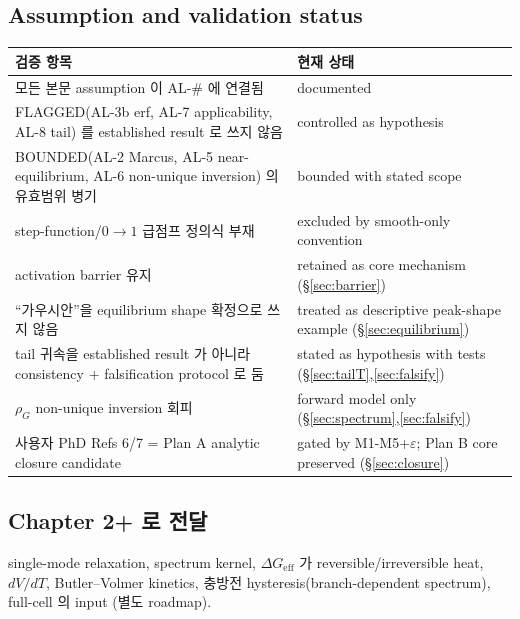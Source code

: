 \documentclass[11pt,a4paper]{article}
\newcommand{\eff}{\mathrm{eff}}
\begin{document}
\subsection{Assumption and validation status}
\begin{longtable}{p{} p{}}
\toprule 검증 항목 & 현재 상태 \\ \midrule \endhead
모든 본문 assumption 이 AL-\# 에 연결됨 & documented \\
FLAGGED(AL-3b erf, AL-7 applicability, AL-8 tail) 를 established result 로 쓰지 않음 & controlled as hypothesis \\
BOUNDED(AL-2 Marcus, AL-5 near-equilibrium, AL-6 non-unique inversion) 의 유효범위 병기 & bounded with stated scope \\
step-function/$0\!\to\!1$ 급점프 정의식 부재 & excluded by smooth-only convention \\
activation barrier 유지 & retained as core mechanism (\S\ref{sec:barrier}) \\
``가우시안''을 equilibrium shape 확정으로 쓰지 않음 & treated as descriptive peak-shape example (\S\ref{sec:equilibrium}) \\
tail 귀속을 established result 가 아니라 consistency + falsification protocol 로 둠 & stated as hypothesis with tests (\S\ref{sec:tailT},\ref{sec:falsify}) \\
$\rho_G$ non-unique inversion 회피 & forward model only (\S\ref{sec:spectrum},\ref{sec:falsify}) \\
사용자 PhD Refs 6/7 = Plan A analytic closure candidate & gated by M1-M5+$\varepsilon$; Plan B core preserved (\S\ref{sec:closure}) \\
\bottomrule
\end{longtable}

\subsection{Chapter 2+ 로 전달}
single-mode relaxation, spectrum kernel, $\Delta G_\eff$ 가 reversible/irreversible heat,
$dV/dT$, Butler--Volmer kinetics, 충방전 hysteresis(branch-dependent spectrum), full-cell
의 input (별도 roadmap).
\end{document}
